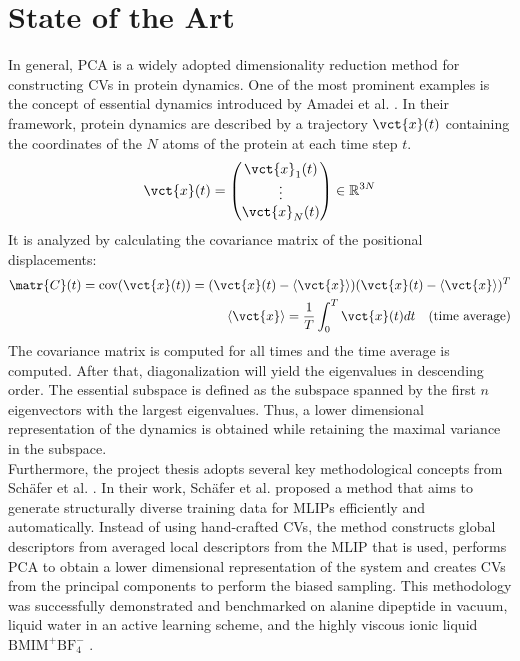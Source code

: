 \section{State of the Art}
In general, PCA is a widely adopted dimensionality reduction method for constructing CVs in protein dynamics.
One of the most prominent examples is the concept of essential dynamics introduced by Amadei et al. \cite{Amadei1993}.
In their framework, protein dynamics are described by a trajectory $\vct{x}(t)$ containing the coordinates of the $N$ atoms of the protein at each time step $t$.
\begin{align}
    \vct{x}(t) = \begin{pmatrix}\vct{x}_1(t) \\ \vdots \\ \vct{x}_N(t)\end{pmatrix} \in \mathbb{R}^{3N} 
\end{align}
It is analyzed by calculating the covariance matrix of the positional displacements:
\begin{align}
    \matr{C}(t) = \operatorname{cov}(\vct{x}(t)) = (\vct{x}(t)-\langle \vct{x} \rangle)(\vct{x}(t)-\langle \vct{x} \rangle)^T \\
    \langle \vct{x} \rangle = \frac{1}{T} \int_0^T \vct{x}(t) dt \quad \text{(time average)}
\end{align}
The covariance matrix is computed for all times and the time average is computed. 
After that, diagonalization will yield the eigenvalues in descending order.
The essential subspace is defined as the subspace spanned by the first $n$ eigenvectors with the largest eigenvalues.
Thus, a lower dimensional representation of the dynamics is obtained while retaining the maximal variance in the subspace.
\cite{Amadei1993} \\

Furthermore, the project thesis adopts several key methodological concepts from Schäfer et al. \cite{Schaefer2025}.
In their work, Schäfer et al. proposed a method that aims to generate structurally diverse training data for MLIPs efficiently and automatically.
Instead of using hand-crafted CVs, the method constructs global descriptors from averaged local descriptors from the MLIP that is used, 
performs PCA to obtain a lower dimensional representation of the system and creates CVs from the principal components to perform the biased sampling. 
This methodology was successfully demonstrated and benchmarked on alanine dipeptide in vacuum, liquid water in an active learning scheme, and the highly viscous ionic liquid $\text{BMIM}^+\text{BF}_4^-$
\cite{Schaefer2025}.
\\

